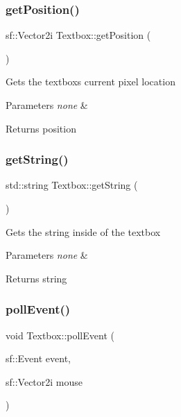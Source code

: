 \subsubsection{\texorpdfstring{get\+Position()}{getPosition()}}
{\footnotesize\ttfamily sf\+::\+Vector2i Textbox\+::get\+Position (\begin{DoxyParamCaption}{ }\end{DoxyParamCaption})}

Gets the textbox\textquotesingle{}s current pixel location


\begin{DoxyParams}{Parameters}
{\em none} & \\
\hline
\end{DoxyParams}
\begin{DoxyReturn}{Returns}
position 
\end{DoxyReturn}
\mbox{\label{classTextbox_a17e61a2d99b5ca00c54a6df45a6018ea}} 
\subsubsection{\texorpdfstring{get\+String()}{getString()}}
{\footnotesize\ttfamily std\+::string Textbox\+::get\+String (\begin{DoxyParamCaption}{ }\end{DoxyParamCaption})}

Gets the string inside of the textbox


\begin{DoxyParams}{Parameters}
{\em none} & \\
\hline
\end{DoxyParams}
\begin{DoxyReturn}{Returns}
string 
\end{DoxyReturn}
\mbox{\label{classTextbox_a0fa6796fb75711d78a180031d510a9ed}} 
\subsubsection{\texorpdfstring{poll\+Event()}{pollEvent()}}
{\footnotesize\ttfamily void Textbox\+::poll\+Event (\begin{DoxyParamCaption}\item[{sf\+::\+Event}]{event,  }\item[{sf\+::\+Vector2i}]{mouse }\end{DoxyParamCaption})}

